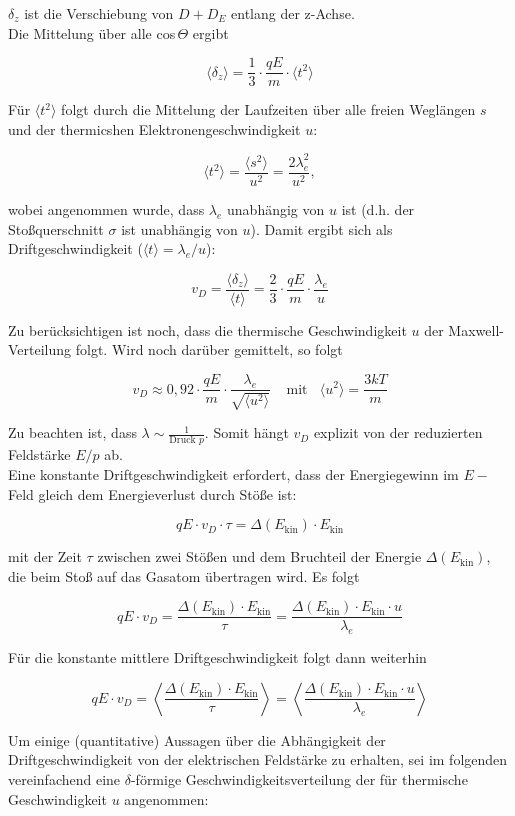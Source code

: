 $\delta_z$ ist die Verschiebung von $D+D_E$ entlang der z-Achse.
\\
Die Mittelung über alle cos$\,\Theta$ ergibt

\[ \langle \delta_z \rangle = \frac{1}{3}\cdot \frac{qE}{m}\cdot \langle t^2 \rangle \]

Für $\langle t^2 \rangle$ folgt durch die Mittelung der Laufzeiten über alle freien Weglängen $s$
und der thermicshen Elektronengeschwindigkeit $u$:

\[ \langle t^2 \rangle = \frac{\langle s^2 \rangle}{u^2} = \frac{2\lambda_e^2}{u^2} ,\]

wobei angenommen wurde, dass $\lambda_e$ unabhängig von $u$ ist (d.h. der Stoßquerschnitt $\sigma$
ist unabhängig von $u$). Damit ergibt sich als Driftgeschwindigkeit ($\langle t
\rangle=\lambda_e/u$):

\[v_D = \frac{\langle \delta_z \rangle}{\langle t\rangle} = \frac{2}{3}\cdot \frac{qE}{m}\cdot
\frac{\lambda_e}{u}\]

Zu berücksichtigen ist noch, dass die thermische Geschwindigkeit $u$ der Maxwell-Verteilung folgt.
Wird noch darüber gemittelt, so folgt

\[v_D\approx 0{,}92\cdot \frac{qE}{m}\cdot \frac{\lambda_e}{\sqrt{\langle
u^2\rangle}}~~~~~\text{mit}~~~~ \langle u^2\rangle = \frac{3kT}{m}\]

Zu beachten ist, dass $\lambda\sim \frac{1}{\text{Druck }p}$. Somit hängt $v_D$ explizit von der
reduzierten Feldstärke $E/p$ ab.
\\
Eine konstante Driftgeschwindigkeit erfordert, dass der Energiegewinn im $E-$Feld gleich
dem Energieverlust durch Stöße ist:

\[qE\cdot v_D\cdot \tau = \Delta(E_\text{kin})\cdot E_\text{kin}  \]

mit der Zeit $\tau$ zwischen zwei Stößen und dem Bruchteil der Energie $\Delta(E_\text{kin})$, die
beim Stoß auf das Gasatom übertragen wird. Es folgt

\[qE\cdot v_D = \frac{\Delta(E_\text{kin})\cdot E_\text{kin}}{\tau} =
\frac{\Delta(E_\text{kin})\cdot E_\text{kin}\cdot u}{\lambda_e}  \]

Für die konstante mittlere Driftgeschwindigkeit folgt dann weiterhin

\[qE\cdot v_D = \left\langle \frac{\Delta(E_\text{kin})\cdot E_\text{kin}}{\tau} \right\rangle =
\left\langle \frac{\Delta(E_\text{kin})\cdot E_\text{kin}\cdot u}{\lambda_e}\right\rangle \]

Um einige (quantitative) Aussagen über die Abhängigkeit der Driftgeschwindigkeit von der
elektrischen Feldstärke zu erhalten, sei im folgenden vereinfachend eine $\delta$-förmige
Geschwindigkeitsverteilung der für thermische Geschwindigkeit $u$ angenommen:

